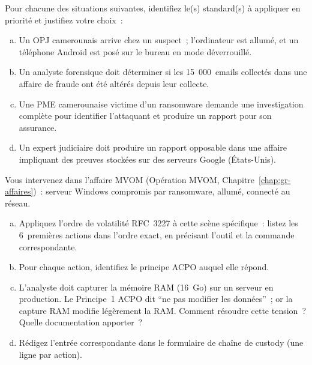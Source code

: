 \bigskip

\begin{boxexo}[title={\ding{45}\quad Exercice~7.1 --- Sélection de standard \niveaubase}]
Pour chacune des situations suivantes, identifiez le(s) standard(s) à
appliquer en priorité et justifiez votre choix~:
\begin{enumerate}[(a)]
    \item Un OPJ camerounais arrive chez un suspect~; l'ordinateur est allumé,
          et un téléphone Android est posé sur le bureau en mode déverrouillé.
    \item Un analyste forensique doit déterminer si les 15~000~emails
          collectés dans une affaire de fraude ont été altérés depuis leur
          collecte.
    \item Une PME camerounaise victime d'un ransomware demande une investigation
          complète pour identifier l'attaquant et produire un rapport
          pour son assurance.
    \item Un expert judiciaire doit produire un rapport opposable dans
          une affaire impliquant des preuves stockées sur des serveurs
          Google (États-Unis).
\end{enumerate}
\end{boxexo}

\begin{boxexo}[title={\ding{45}\quad Exercice~7.2 --- Application ACPO + RFC~3227 \niveaumoyen}]
Vous intervenez dans l'affaire MVOM (Opération MVOM, Chapitre~\ref{chap:gr-affaires})~:
serveur Windows compromis par ransomware, allumé, connecté au réseau.
\begin{enumerate}[(a)]
    \item Appliquez l'ordre de volatilité RFC~3227 à cette scène spécifique~:
          listez les 6~premières actions dans l'ordre exact, en précisant
          l'outil et la commande correspondante.
    \item Pour chaque action, identifiez le principe ACPO auquel elle répond.
    \item L'analyste doit capturer la mémoire RAM (16~Go) sur un serveur
          en production. Le Principe~1 ACPO dit ``ne pas modifier les données''~;
          or la capture RAM modifie légèrement la RAM. Comment résoudre
          cette tension~? Quelle documentation apporter~?
    \item Rédigez l'entrée correspondante dans le formulaire de chaîne
          de custody (une ligne par action).
\end{enumerate}
\end{boxexo}

